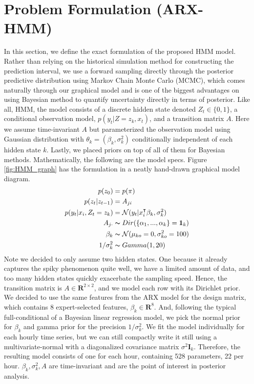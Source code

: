 \documentclass[11pt, letterpaper, journal]{IEEEtran}
\begin{document}
\section{Problem Formulation (ARX-HMM)}
In this section, we define the exact formulation of the proposed HMM model. Rather than relying on the historical simulation method for constructing the prediction interval, we use a forward sampling directly through the posterior predictive distribution using Markov Chain Monte Carlo (MCMC), which comes naturally through our graphical model and is one of the biggest advantages on using Bayesian method to quantify uncertainty directly in terms of posterior. Like all, HMM, the model consists of a discrete hidden state denoted $Z_t \in \{0, 1\}$, a conditional observation model, $p(y_t|Z=z_k, x_t)$, and a transition matrix $A$. Here we assume time-invariant $A$ but parameterized the observation model using Gaussian distribution with $\theta_k=(\beta_k, \sigma_k^2)$ conditionally independent of each hidden state $k$. Lastly, we placed priors on top of all of them for Bayesian methods. Mathematically, the following are the model specs. Figure \ref{fig:HMM_graph} has the formulation in a neatly hand-drawn graphical model diagram.
\begin{align*}
    p(z_0) &= p(\pi) \\
    p(z_t|z_{t-1}) &= A_{ji} \\
    p(y_t|x_i, Z_t=z_k) &= \mathcal{N}(y_t|x_i^{\intercal}\beta_k, \sigma^2_k) \\
    A_{j\cdot} &\thicksim Dir(\{\alpha_1, ..., \alpha_k\}=\mathbf{1}_k) \\
    \beta_k &\thicksim \mathcal{N}(\mu_{ko}=0, \sigma^2_{ko}=100) \\
    1/\sigma^2_{k} &\thicksim Gamma(1, 20)
\end{align*}
Note we decided to only assume two hidden states. One because it already captures the spiky phenomenon quite well, we have a limited amount of data, and too many hidden states quickly exacerbate the sampling speed. Hence, the transition matrix is $A \in \mathbf{R}^{2\times 2}$, and we model each row with its Dirichlet prior. We decided to use the same features from the ARX model for the design matrix, which contains 8 expert-selected features, $\beta_k \in \mathbf{R}^8$. And, following the typical full-conditional of a Bayesian linear regression model, we pick the normal prior for $\beta_k$ and gamma prior for the precision $1/\sigma^2_k$. We fit the model individually for each hourly time series, but we can still compactly write it still using a multivariate-normal with a diagonalized covariance matrix $\sigma^2\mathbf{I}_k$. Therefore, the resulting model consists of one for each hour, containing 528 parameters, 22 per hour. $\beta_k, \sigma^2_k, A$ are time-invariant and are the point of interest in posterior analysis.
\end{document}
